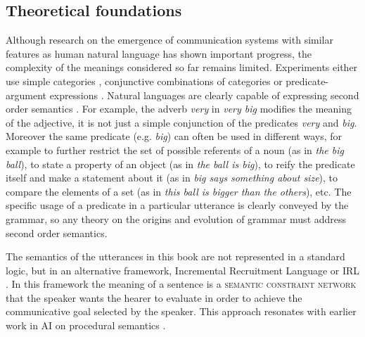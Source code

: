 \subsection{Theoretical foundations}

Although research on the emergence of communication systems with
similar features as human natural language has shown important
progress, the complexity of the meanings considered so far remains
limited. Experiments either use simple categories
\citep{steels05coordinating, belpaeme05explaining}, conjunctive
combinations of categories \citep{wellens08flexible} or
predicate-argument expressions \citep{batali02negotiation,
  smith03iterated, debeule08emergence}. Natural languages are clearly
capable of expressing second order semantics
\citep{dowty1981introduction}. For example, the adverb \textit{very} in
\textit{very big} modifies the meaning of the adjective, it is not just a
simple conjunction of the predicates \textit{very} and \textit{big}. Moreover the
same predicate (e.g. \textit{big}) can often be used in different ways, for
example to further restrict the set of possible referents of a noun
(as in \textit{the big ball}), to state a property of an object (as in
\textit{the ball is big}), to reify the predicate itself and make a
statement about it (as in \textit{big says something about size}), to
compare the elements of a set (as in \textit{this ball is bigger than the
others}), etc. The specific usage of a predicate in a particular
utterance is clearly conveyed by the grammar, so any theory on the
origins and evolution of grammar must address second order semantics.

The semantics of the utterances in this book are not represented in
a standard logic, but in an alternative framework, Incremental
Recruitment Language or IRL \citep{steels00emergence,
  steels05planning, vandenbroeck07constraintbased,
  vandenbroeck08constraintbased}. In this framework the meaning of a
sentence is a \textsc{semantic constraint network} that the speaker
wants the hearer to evaluate in order to achieve the communicative
goal selected by the speaker. This approach resonates with earlier
work in AI on procedural semantics \citep{winograd72understanding}.

